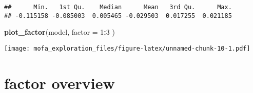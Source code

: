\documentclass[
]{article}
\newenvironment{Shaded}{\begin{snugshade}}{\end{snugshade}}
\newcommand{\DataTypeTok}[1]{\textcolor[rgb]{0.13,0.29,0.53}{#1}}
\newcommand{\DecValTok}[1]{\textcolor[rgb]{0.00,0.00,0.81}{#1}}
\newcommand{\KeywordTok}[1]{\textcolor[rgb]{0.13,0.29,0.53}{\textbf{#1}}}
\newcommand{\NormalTok}[1]{#1}
\newcommand{\OperatorTok}[1]{\textcolor[rgb]{0.81,0.36,0.00}{\textbf{#1}}}
\begin{document}
\begin{verbatim}
##      Min.   1st Qu.    Median      Mean   3rd Qu.      Max. 
## -0.115158 -0.085003  0.005465 -0.029503  0.017255  0.021185
\end{verbatim}

\begin{Shaded}
\begin{Highlighting}[]
\KeywordTok{plot_factor}\NormalTok{(model, }
  \DataTypeTok{factor =} \DecValTok{1}\OperatorTok{:}\DecValTok{3}
\NormalTok{)}
\end{Highlighting}
\end{Shaded}

\texttt{[image: mofa\_exploration\_files/figure-latex/unnamed-chunk-10-1.pdf]}

\hypertarget{factor-overview}{%
\section{factor overview}\label{factor-overview}}
\end{document}
